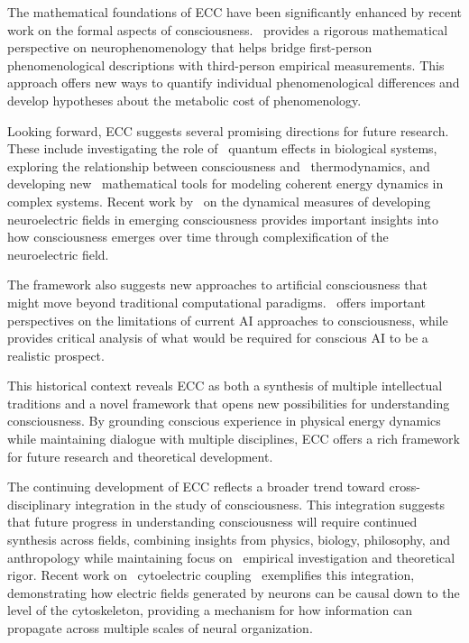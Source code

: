 The mathematical foundations of ECC have been significantly enhanced by recent work on the formal aspects of consciousness.~\cite{da2024mathematical} provides a rigorous mathematical perspective on neurophenomenology that helps bridge first-person phenomenological descriptions with third-person empirical measurements. This approach offers new ways to quantify individual phenomenological differences and develop hypotheses about the metabolic cost of phenomenology.

Looking forward, ECC suggests several promising directions for future research. These include investigating the role of~ quantum effects in biological systems, exploring the relationship between consciousness and~ thermodynamics, and developing new~ mathematical tools for modeling coherent energy dynamics in complex systems. Recent work by~\cite{bosl2025dynamical} on the dynamical measures of developing neuroelectric fields in emerging consciousness provides important insights into how consciousness emerges over time through complexification of the neuroelectric field.

The framework also suggests new approaches to artificial consciousness that might move beyond traditional computational paradigms.~\cite{butlin2023consciousnessartificialintelligenceinsights} offers important perspectives on the limitations of current AI approaches to consciousness, while~\cite{seth2024conscious} provides critical analysis of what would be required for conscious AI to be a realistic prospect.

This historical context reveals ECC as both a synthesis of multiple intellectual traditions and a novel framework that opens new possibilities for understanding consciousness. By grounding conscious experience in physical energy dynamics while maintaining dialogue with multiple disciplines, ECC offers a rich framework for future research and theoretical development.

The continuing development of ECC reflects a broader trend toward cross-disciplinary integration in the study of consciousness. This integration suggests that future progress in understanding consciousness will require continued synthesis across fields, combining insights from physics, biology, philosophy, and anthropology while maintaining focus on~ empirical investigation and theoretical rigor. Recent work on~ cytoelectric coupling~\cite{pinotsis2023cytoelectric} exemplifies this integration, demonstrating how electric fields generated by neurons can be causal down to the level of the cytoskeleton, providing a mechanism for how information can propagate across multiple scales of neural organization.